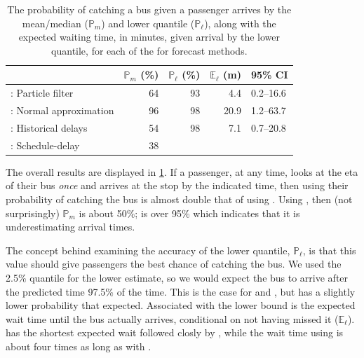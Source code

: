 \begin{knitrout}\small
{}\color{fgcolor}\begin{table}

\caption{\label{tab:model_results_pr_miss}The probability of catching a bus given a passenger arrives by the mean/median ($\mathbb{P}_m$) and lower quantile ($\mathbb{P}_\ell$), along with the expected waiting time, in minutes, given arrival by the lower quantile, for each of the for forecast methods.}
\centering
\fontsize{8}{10}\selectfont
\begin{tabular}[t]{lrrrl}
\toprule
  & $\mathbb{P}_m$ (\%) & $\mathbb{P}_\ell$ (\%) & $\mathbb{E}_\ell$ (m) & 95\% CI\\
\midrule
\Fpf{}: Particle filter & 64 & 93 & 4.4 & 0.2--16.6\\
\Fnorm{}: Normal approximation & 96 & 98 & 20.9 & 1.2--63.7\\
\Fhist{}: Historical delays & 54 & 98 & 7.1 & 0.7--20.8\\
\Fsched{}: Schedule-delay & 38 &  &  & \\
\bottomrule
\end{tabular}
\end{table}


\end{knitrout}



The overall results are displayed in \cref{tab:model_results_pr_miss}. If a passenger, at any time, looks at the \gls{eta} of their bus \emph{once} and arrives at the stop by the indicated time, then using \Fpf{} their probability of catching the bus is almost double that of using \Fsched{}. Using \Fhist{}, then (not surprisingly) $\mathbb{P}_m$ is about 50\%; \Fnorm{} is over 95\% which indicates that it is underestimating arrival times.



The concept behind examining the accuracy of the lower quantile, $\mathbb{P}_\ell$, is that this value should give passengers the best chance of catching the bus. We used the 2.5\% quantile for the lower estimate, so we would expect the bus to arrive after the predicted time 97.5\% of the time. This is the case for \Fnorm{} and \Fhist{}, but \Fpf{} has a slightly lower probability that expected. Associated with the lower bound is the expected wait time until the bus actually arrives, conditional on not having missed it ($\mathbb{E}_\ell$). \Fpf{} has the shortest expected wait followed closly by \Fhist{}, while the wait time using \Fnorm{} is about four times as long as with \Fpf{}.



